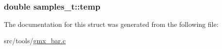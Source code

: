 \hypertarget{structsamples__t_ab34a61611ceed2ae37c0daabc97709d1}{
\subsubsection[{temp}]{\setlength{\rightskip}{0pt plus 5cm}double {\bf samples\-\_\-t\-::temp}}}\label{structsamples__t_ab34a61611ceed2ae37c0daabc97709d1}


\-The documentation for this struct was generated from the following file\-:\begin{DoxyCompactItemize}
\item 
src/tools/\hyperlink{gmx__bar_8c}{gmx\-\_\-bar.\-c}\end{DoxyCompactItemize}
